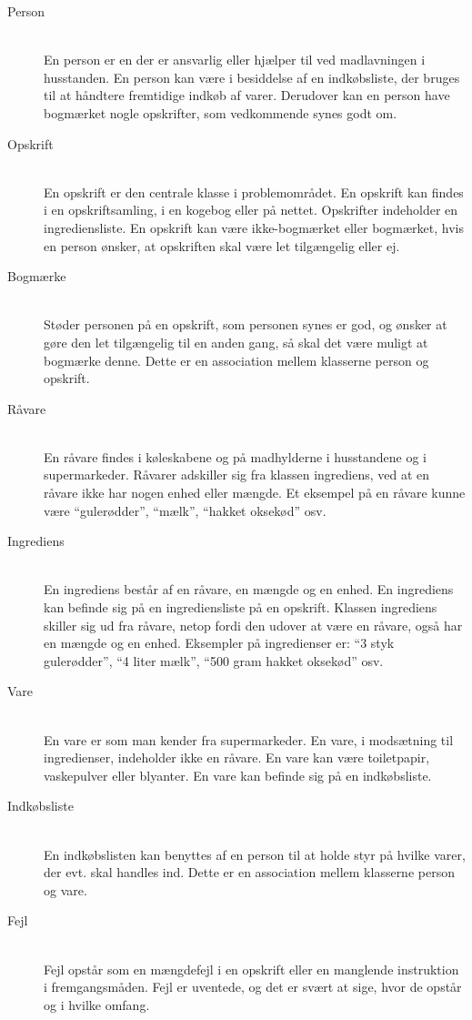 \begin{description}
\item[Person] \hfill \\
En person er en der er ansvarlig eller hjælper til ved madlavningen i husstanden. En person kan være i besiddelse af en indkøbsliste, der bruges til at håndtere fremtidige indkøb af varer. Derudover kan en person have bogmærket nogle opskrifter, som vedkommende synes godt om.

\item[Opskrift] \hfill \\
En opskrift er den centrale klasse i problemområdet. En opskrift kan findes i en opskriftsamling, i en kogebog eller på nettet. Opskrifter indeholder en ingrediensliste. En opskrift kan være ikke-bogmærket eller bogmærket, hvis en person ønsker, at opskriften skal være let tilgængelig eller ej.

\item[Bogmærke] \hfill \\
Støder personen på en opskrift, som personen synes er god, og ønsker at gøre den let tilgængelig til en anden gang, så skal det være muligt at bogmærke denne. Dette er en association mellem klasserne person og opskrift.

\item[Råvare] \hfill \\
En råvare findes i køleskabene og på madhylderne i husstandene og i supermarkeder. Råvarer adskiller sig fra klassen ingrediens, ved at en råvare ikke har nogen enhed eller mængde. Et eksempel på en råvare kunne være ``gulerødder'', ``mælk'', ``hakket oksekød'' osv. 

\item[Ingrediens] \hfill \\ 
En ingrediens består af en råvare, en mængde og en enhed. En ingrediens kan befinde sig på en ingrediensliste på en opskrift. Klassen ingrediens skiller sig ud fra råvare, netop fordi den udover at være en råvare, også har en mængde og en enhed. Eksempler på ingredienser er: ``3 styk gulerødder'', ``4 liter mælk'', ``500 gram hakket oksekød'' osv.

\item[Vare] \hfill \\
En vare er som man kender fra supermarkeder. En vare, i modsætning til ingredienser, indeholder ikke en råvare. En vare kan \fx være toiletpapir, vaskepulver eller blyanter. En vare kan befinde sig på en indkøbsliste.

\item[Indkøbsliste] \hfill \\
En indkøbslisten kan benyttes af en person til at holde styr på hvilke varer, der evt. skal handles ind. Dette er en association mellem klasserne person og vare.

\item[Fejl] \hfill \\
Fejl opstår som \fx en mængdefejl i en opskrift eller en manglende instruktion i fremgangsmåden. Fejl er uventede, og det er svært at sige, hvor de opstår og i hvilke omfang.

\end{description}

